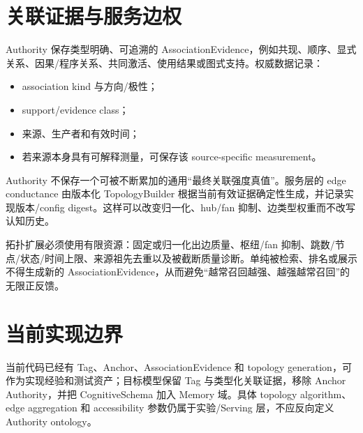 \section{关联证据与服务边权}

Authority 保存类型明确、可追溯的 AssociationEvidence，例如共现、顺序、显式关系、因果/程序关系、共同激活、使用结果或图式支持。权威数据记录：

\begin{itemize}
\item association kind 与方向/极性；
\item support/evidence class；
\item 来源、生产者和有效时间；
\item 若来源本身具有可解释测量，可保存该 source-specific measurement。
\end{itemize}

Authority 不保存一个可被不断累加的通用“最终关联强度真值”。服务层的 edge conductance 由版本化 TopologyBuilder 根据当前有效证据确定性生成，并记录实现版本/config digest。这样可以改变归一化、hub/fan 抑制、边类型权重而不改写认知历史。

拓扑扩展必须使用有限资源：固定或归一化出边质量、枢纽/fan 抑制、跳数/节点/状态/时间上限、来源祖先去重以及被截断质量诊断。单纯被检索、排名或展示不得生成新的 AssociationEvidence，从而避免“越常召回越强、越强越常召回”的无限正反馈。\cite{anderson1983,nous-research-package}

\section{当前实现边界}

当前代码已经有 Tag、Anchor、AssociationEvidence 和 topology generation，可作为实现经验和测试资产；目标模型保留 Tag 与类型化关联证据，移除 Anchor Authority，并把 CognitiveSchema 加入 Memory 域。具体 topology algorithm、edge aggregation 和 accessibility 参数仍属于实验/Serving 层，不应反向定义 Authority ontology。
